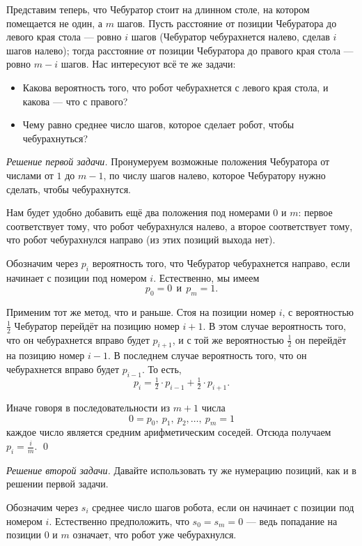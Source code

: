 \documentclass{article}
\begin{document}
Представим теперь, что Чебуратор стоит на длинном столе, на котором помещается не один, а $m$ шагов.
Пусть расстояние от позиции Чебуратора до левого края стола --- ровно $i$ шагов (Чебуратор чебурахнется
налево, сделав $i$ шагов налево); тогда расстояние от позиции Чебуратора до правого края стола --- ровно
$m-i$ шагов. Нас интересуют всё те же задачи:

\begin{itemize}
\item Какова вероятность того, что робот чебурахнется с левого края стола, и какова --- что с правого?
\item Чему равно среднее число шагов, которое сделает робот, чтобы чебурахнуться?
\end{itemize}

\medskip
\noindent\textit{Решение первой задачи.}
Пронумеруем возможные положения Чебуратора от числами от $1$ до $m-1$,
по числу шагов налево, которое Чебуратору нужно сделать, чтобы чебурахнутся.

Нам будет удобно добавить ещё два положения под номерами $0$ и $m$:
первое соответствует тому, что робот чебурахнулся налево, 
а второе соответствует тому, что робот чебурахнулся направо
(из этих позиций выхода нет).


Обозначим через $p_i$ вероятность того, что Чебуратор чебурахнется направо,
если начинает с позиции под номером $i$.
Естественно, мы имеем 
\[p_0=0\ \  \text{и}\ \  p_{m}=1.\]

Применим тот же метод, что и раньше.
Стоя на позиции номер $i$,
с вероятностью $\tfrac12$ Чебуратор перейдёт на позицию номер $i+1$.
В этом случае вероятность того, что он чебурахнется вправо будет $p_{i+1}$,
и с той же вероятностью $\tfrac12$ он перейдёт на позицию номер $i-1$. 
В последнем случае вероятность того, что он чебурахнется вправо будет $p_{i-1}$.
То есть,
\[p_i=\tfrac12\cdot p_{i-1}+\tfrac12\cdot p_{i+1}.\]

Иначе говоря в последовательности из $m+1$ числа
\[0=p_0,\ p_1,\ p_2,\dots,\ p_{m}=1\] 
каждое число является средним арифметическим 
соседей.
Отсюда получаем $p_i=\tfrac im$.
\qed

\medskip
\noindent\textit{Решение второй задачи.}
Давайте использовать ту же нумерацию позиций, как и в решении первой задачи.

Обозначим через $s_i$ среднее число шагов робота, если он начинает с позиции под номером $i$.
Естественно предположить, что $s_0=s_{m}=0$ ---
ведь попадание на позиции $0$ и $m$ означает, что робот уже чебурахнулся.
\end{document}
